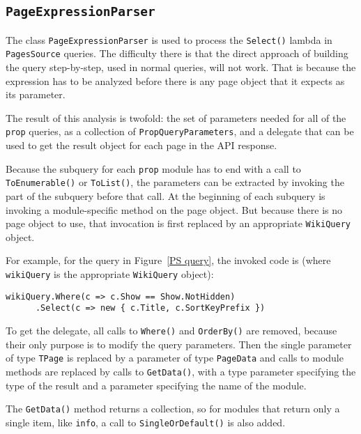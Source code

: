\subsection{\texorpdfstring{\lstinline{PageExpressionParser}}{PageExpressionParser}}
\label{PageExpressionParser}

The class \lstinline{PageExpressionParser} is used to process
the \lstinline{Select()} lambda in \lstinline{PagesSource} queries.
The difficulty there is that the direct approach of building the query step-by-step,
used in normal queries, will not work.
That is because the expression has to be analyzed before there is any page object
that it expects as its parameter.

The result of this analysis is twofold:
the set of parameters needed for all of the \lstinline{prop} queries,
as a collection of \lstinline{PropQueryParameters},
and a delegate that can be used to get the result object for each page in the API response.

\medskip

Because the subquery for each \texttt{prop} module has to end with a call to \lstinline{To}\lstBreak\lstinline{Enumerable()} or \lstinline{ToList()},
the parameters can be extracted by invoking the part of the subquery before that call.
At the beginning of each subquery is invoking a module-specific method on the page object.
But because there is no page object to use, that invocation is first replaced by an appropriate \lstinline{WikiQuery} object.

For example, for the query in Figure~\ref{PS query}, the invoked code is (where \lstinline{wikiQuery} is the appropriate \lstinline{WikiQuery} object):

\begin{lstlisting}
wikiQuery.Where(c => c.Show == Show.NotHidden)
	  .Select(c => new { c.Title, c.SortKeyPrefix })
\end{lstlisting}

\medskip

To get the delegate, all calls to \lstinline{Where()} and \lstinline{OrderBy()} are removed,
because their only purpose is to modify the query parameters.
Then the single parameter of type \lstinline{TPage} is replaced by a parameter of type \lstinline{PageData}
and calls to module methods are replaced by calls to \lstinline{GetData()},
with a type parameter specifying the type of the result and a parameter specifying the name of the module.

The \lstinline{GetData()} method returns a collection,
so for modules that return only a single item, like \texttt{info},
a call to \lstinline{Single}\lstBreak\lstinline{Or}\lstBreak\lstinline{Default()} is also added.

